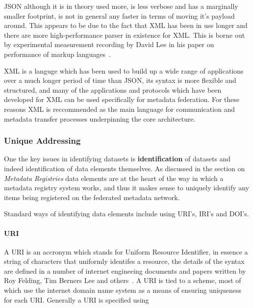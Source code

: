 \documentclass{article}
\begin{document}
		JSON although it is in theory used more, is less verbose and has a marginally smaller footprint, is not in general any faster in terms of moving it's payload around. This appears to be due to the fact that XML has been in use longer and there are more high-performance parser in existence for XML. This is borne out by experimental measurement recording by David Lee in his paper on performance of markup languages~\cite{fatmarkup}. 
		
		XML is a languge which has been used to build up a wide range of applications over a much longer period of time than JSON, its syntax is more flexible and structured, and many of the applications and protocols which have been developed for XML can be used specifically for metadata federation. For these reasons XML is reccommended as the main language for communication and metadata transfer processes underpinning the core architecture. 
		
		
		\subsubsection{Unique Addressing}
		
		One the key issues in identifying datasets is \textbf{identification} of datasets and indeed identification of data elements themselves. As discussed in the section on \emph{Metadata Registries} data elements are at the heart of the way in which a metadata registry system works, and thus it makes sense to uniquely identify any items being registered on the federated metadata network.
		
		Standard ways of identifying data elements include using URI's, IRI's and DOI's.
		
		\paragraph{URI}
		A URI is an accronym which stands for Uniform Resource Identifier, in essence a string of characters that uniformly identifes a resource, the details of the syntax are defined in a number of internet engineeing documents and papers written by Roy Felding, Tim Berners Lee and others~\cite{uri1, uri2, uri3}. A URI is tied to a scheme, most of which use the internet domain name system as a means of ensuring uniqueness for each URI. Generally a URI is specified using 
		
\end{document}
